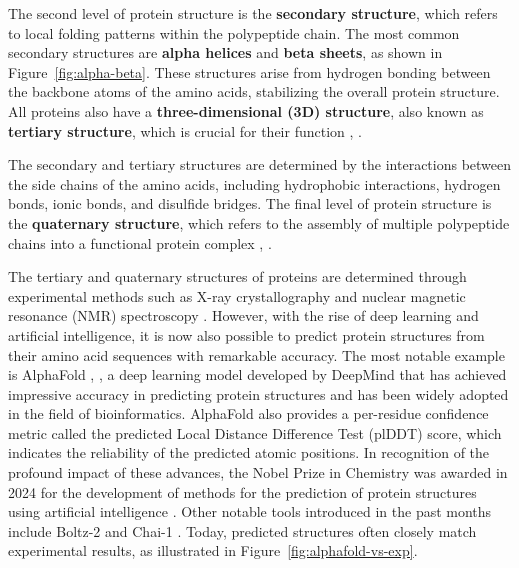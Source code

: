 The second level of protein structure is the \textbf{secondary structure}, which refers to local folding patterns within the polypeptide chain. The most common secondary structures are \textbf{alpha helices} and \textbf{beta sheets}, as shown in Figure~\ref{fig:alpha-beta}. These structures arise from hydrogen bonding between the backbone atoms of the amino acids, stabilizing the overall protein structure. All proteins also have a \textbf{three-dimensional (3D) structure}, also known as \textbf{tertiary structure}, which is crucial for their function \cite{nelson2008lehninger}, \cite{voet2010biochemistry}.

The secondary and tertiary structures are determined by the interactions between the side chains of the amino acids, including hydrophobic interactions, hydrogen bonds, ionic bonds, and disulfide bridges. The final level of protein structure is the \textbf{quaternary structure}, which refers to the assembly of multiple polypeptide chains into a functional protein complex \cite{nelson2008lehninger}, \cite{voet2010biochemistry}.

The tertiary and quaternary structures of proteins are determined through experimental methods such as X-ray crystallography and nuclear magnetic resonance (NMR) spectroscopy \cite{berman2000protein}. However, with the rise of deep learning and artificial intelligence, it is now also possible to predict protein structures from their amino acid sequences with remarkable accuracy. The most notable example is AlphaFold \cite{jumper2021highly}, \cite{abramson2024accurate}, a deep learning model developed by DeepMind that has achieved impressive accuracy in predicting protein structures and has been widely adopted in the field of bioinformatics. AlphaFold also provides a per-residue confidence metric called the predicted Local Distance Difference Test (plDDT) score\footnotemark[1], which indicates the reliability of the predicted atomic positions. In recognition of the profound impact of these advances, the Nobel Prize in Chemistry was awarded in 2024 for the development of methods for the prediction of protein structures using artificial intelligence \cite{abriata2024nobel}. Other notable tools introduced in the past months include Boltz-2 \cite{passaro2025boltz2} and Chai-1 \cite{chai2024chai}. Today, predicted structures often closely match experimental results, as illustrated in Figure~\ref{fig:alphafold-vs-exp}.


